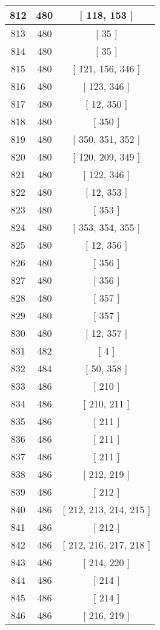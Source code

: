 \begin{center}
\begin{longtable}[H]{|| c c c ||}
812 & 480 & [ 118, 153 ] \\ 
\hline
813 & 480 & [ 35 ] \\ 
\hline
814 & 480 & [ 35 ] \\ 
\hline
815 & 480 & [ 121, 156, 346 ] \\ 
\hline
816 & 480 & [ 123, 346 ] \\ 
\hline
817 & 480 & [ 12, 350 ] \\ 
\hline
818 & 480 & [ 350 ] \\ 
\hline
819 & 480 & [ 350, 351, 352 ] \\ 
\hline
820 & 480 & [ 120, 209, 349 ] \\ 
\hline
821 & 480 & [ 122, 346 ] \\ 
\hline
822 & 480 & [ 12, 353 ] \\ 
\hline
823 & 480 & [ 353 ] \\ 
\hline
824 & 480 & [ 353, 354, 355 ] \\ 
\hline
825 & 480 & [ 12, 356 ] \\ 
\hline
826 & 480 & [ 356 ] \\ 
\hline
827 & 480 & [ 356 ] \\ 
\hline
828 & 480 & [ 357 ] \\ 
\hline
829 & 480 & [ 357 ] \\ 
\hline
830 & 480 & [ 12, 357 ] \\ 
\hline
831 & 482 & [ 4 ] \\ 
\hline
832 & 484 & [ 50, 358 ] \\ 
\hline
833 & 486 & [ 210 ] \\ 
\hline
834 & 486 & [ 210, 211 ] \\ 
\hline
835 & 486 & [ 211 ] \\ 
\hline
836 & 486 & [ 211 ] \\ 
\hline
837 & 486 & [ 211 ] \\ 
\hline
838 & 486 & [ 212, 219 ] \\ 
\hline
839 & 486 & [ 212 ] \\ 
\hline
840 & 486 & [ 212, 213, 214, 215 ] \\ 
\hline
841 & 486 & [ 212 ] \\ 
\hline
842 & 486 & [ 212, 216, 217, 218 ] \\ 
\hline
843 & 486 & [ 214, 220 ] \\ 
\hline
844 & 486 & [ 214 ] \\ 
\hline
845 & 486 & [ 214 ] \\ 
\hline
846 & 486 & [ 216, 219 ] \\ 
\hline

\end{longtable}
\end{center}
